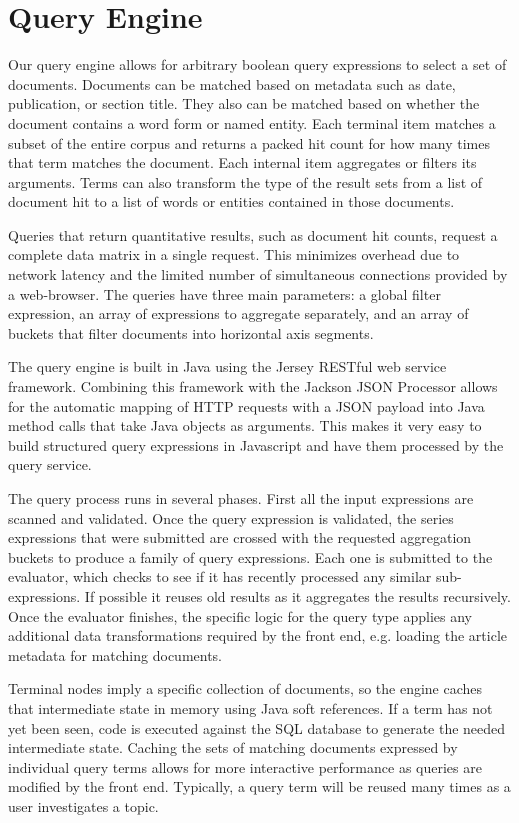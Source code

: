 \section{Query Engine}
Our query engine allows for arbitrary boolean query expressions to select a set of documents.  Documents can be matched based on metadata such as date, publication, or section title. They also can be matched based on whether the document contains a word form or named entity.  Each terminal item matches a subset of the entire corpus and returns a packed hit count for how many times that term matches the document.  Each internal item aggregates or filters its arguments.  Terms can also transform the type of the result sets from a list of document hit to a list of words or entities contained in those documents.

Queries that return quantitative results, such as document hit counts, request a complete data matrix in a single request.  This minimizes overhead due to network latency and the limited number of simultaneous connections provided by a web-browser.  The queries have three main parameters: a global filter expression, an array of expressions to aggregate separately, and an array of buckets that filter documents into horizontal axis segments.



The query engine is built in Java using the Jersey RESTful web service framework.  Combining this framework with the Jackson JSON Processor allows for the automatic mapping of HTTP requests with a JSON payload into Java method calls that take Java objects as arguments.  This makes it very easy to build structured query expressions in Javascript and have them processed by the query service.

The query process runs in several phases.  First all the input expressions are scanned and validated.  Once the query expression is validated, the series expressions that were submitted are crossed with the requested aggregation buckets to produce a family of query expressions.  Each one is submitted to the evaluator, which checks to see if it has recently processed any similar sub-expressions. If possible it reuses old results as it aggregates the results recursively.  Once the evaluator finishes, the specific logic for the query type applies any additional data transformations required by the front end, e.g. loading the article metadata for matching documents.


Terminal nodes imply a specific collection of documents, so the engine caches that intermediate state in memory using Java soft references.  If a term has not yet been seen, code is executed against the SQL database to generate the needed intermediate state.  Caching the sets of matching documents expressed by individual query terms allows for more interactive performance as queries are modified by the front end.  Typically, a query term will be reused many times as a user investigates a topic.

